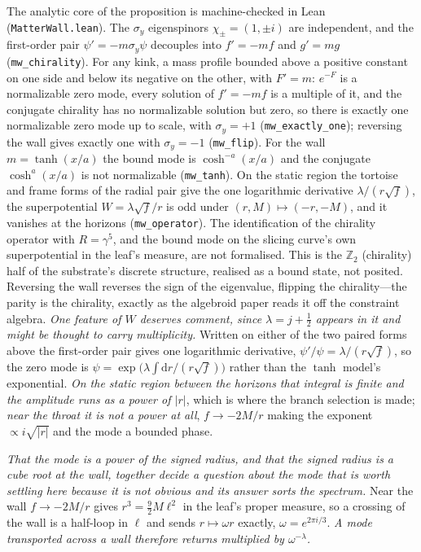 \documentclass[11pt]{article}
\newcommand{\dd}{\mathrm{d}}
\begin{document}
\noindent The analytic core of the proposition is machine-checked in Lean (\texttt{MatterWall.lean}). The $\sigma_y$ eigenspinors $\chi_\pm=(1,\pm i)$ are independent, and the first-order pair $\psi'=-m\sigma_y\psi$ decouples into $f'=-mf$ and $g'=mg$ (\texttt{mw\_chirality}). For any kink, a mass profile bounded above a positive constant on one side and below its negative on the other, with $F'=m$: $e^{-F}$ is a normalizable zero mode, every solution of $f'=-mf$ is a multiple of it, and the conjugate chirality has no normalizable solution but zero, so there is exactly one normalizable zero mode up to scale, with $\sigma_y=+1$ (\texttt{mw\_exactly\_one}); reversing the wall gives exactly one with $\sigma_y=-1$ (\texttt{mw\_flip}). For the wall $m=\tanh(x/a)$ the bound mode is $\cosh^{-a}(x/a)$ and the conjugate $\cosh^{a}(x/a)$ is not normalizable (\texttt{mw\_tanh}). On the static region the tortoise and frame forms of the radial pair give the one logarithmic derivative $\lambda/(r\sqrt f)$, the superpotential $W=\lambda\sqrt f/r$ is odd under $(r,M)\mapsto(-r,-M)$, and it vanishes at the horizons (\texttt{mw\_operator}). The identification of the chirality operator with $R=\gamma^5$, and the bound mode on the slicing curve's own superpotential in the leaf's measure, are not formalised.
This is the $\mathbb{Z}_2$ (chirality) half of the substrate's discrete structure, realised as a bound state, not posited. Reversing the wall reverses the sign of the eigenvalue, flipping the chirality---the parity is the chirality, exactly as the algebroid paper reads it off the constraint algebra. \emph{One feature of $W$ deserves comment, since $\lambda=j+\tfrac12$ appears in it and might be thought to
carry multiplicity.} Written on either of the two paired forms above the first-order pair gives one logarithmic
derivative, $\psi'/\psi=\lambda/(r\sqrt f)$, so the zero mode is
$\psi=\exp\!\bigl(\lambda\!\int\!\dd r/(r\sqrt f)\bigr)$ rather than the $\tanh$ model's exponential.
\emph{On the static region between the horizons that integral is finite and the amplitude runs as a
power of $\lvert r\rvert$}, which is where the branch selection is made; \emph{near the throat it is
not a power at all}, $f\to-2M/r$ making the exponent $\propto i\sqrt{\lvert r\rvert}$ and the mode a
bounded phase.

\emph{That the mode is a power of the signed radius, and that the signed radius is a cube root at the wall,
together decide a question about the mode that is worth settling here because it is not obvious and its answer
sorts the spectrum.} Near the wall $f\to-2M/r$ gives $r^{3}=\tfrac92 M\ell^{2}$ in the
leaf's proper measure, so a crossing of the wall is a half-loop in $\ell$ and sends $r\mapsto\omega r$ exactly,
$\omega=e^{2\pi i/3}$. \emph{A mode transported across a wall therefore returns multiplied by
$\omega^{-\lambda}$.} 
\end{document}
